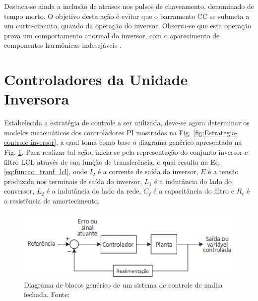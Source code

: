 Destaca-se ainda a inclusão de atrasos nos pulsos de chaveamento, denominado de tempo morto. O objetivo desta ação é evitar que o barramento CC se submeta a um curto-circuito, quando da operação do inversor. Observa-se que esta operação prova um comportamento anormal do inversor, com o aparecimento de componentes harmônicas indesejáveis \cite{DissertacaoLeandro}. 

\section{Controladores da Unidade Inversora}

Estabelecida a estratégia de controle a ser utilizada, deve-se agora determinar os modelos matemáticos dos controladores PI mostrados na Fig. \ref{fig:Estrategia-controle-inversor}, a qual toma como base o diagrama genérico apresentado na Fig. \ref{fig:Controlador_Pi_Generico}. Para realizar tal ação, inicia-se pela representação do conjunto inversor e filtro LCL através de sua função de transferência, o qual resulta na Eq. \ref{eq:funcao_tranf_lcl}, onde $I_2$ é a corrente de saída do inversor, $E$ é a tensão produzida nos terminais de saída do inversor, $L_1$ é a indutância do lado do conversor, $L_2$ é a indutância do lado da rede, $C_f$ é a capacitância do filtro e $R_c$ é a resistência de amortecimento.

\begin{figure}[!hbt]
	\begin{center}
		\includegraphics[width=\columnwidth]{figuras/Controlador_PI_Generico.PNG}
		\caption{Diagrama de blocos genérico de um sistema de controle de malha fechada. Fonte: \cite{DissertacaoLeandro}}
		\label{fig:Controlador_Pi_Generico}
	\end{center}
\end{figure}

